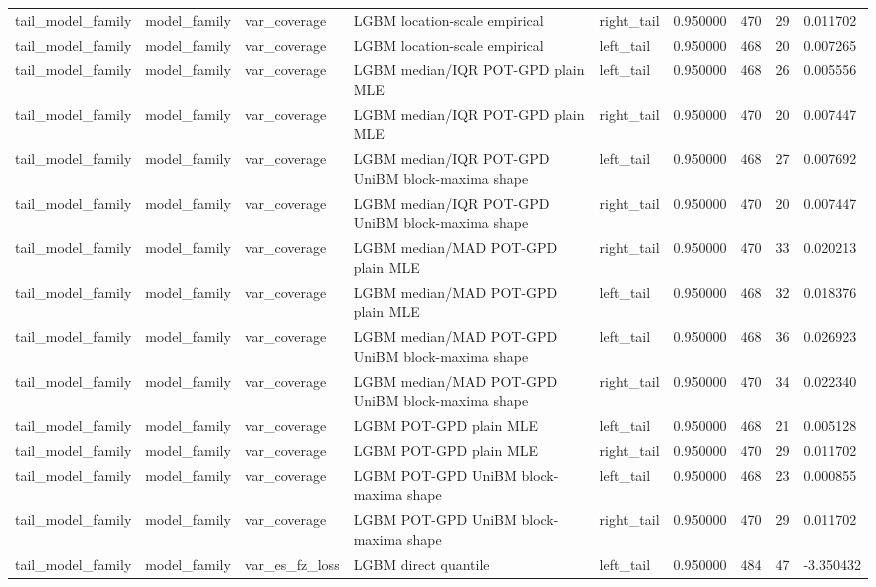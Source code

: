 \begin{tabular}{lllllrrr}
tail\_model\_family & model\_family & var\_coverage & LGBM location-scale empirical & right\_tail & 0.950000 & 470 & 29 & 0.011702 \\
tail\_model\_family & model\_family & var\_coverage & LGBM location-scale empirical & left\_tail & 0.950000 & 468 & 20 & 0.007265 \\
tail\_model\_family & model\_family & var\_coverage & LGBM median/IQR POT-GPD plain MLE & left\_tail & 0.950000 & 468 & 26 & 0.005556 \\
tail\_model\_family & model\_family & var\_coverage & LGBM median/IQR POT-GPD plain MLE & right\_tail & 0.950000 & 470 & 20 & 0.007447 \\
tail\_model\_family & model\_family & var\_coverage & LGBM median/IQR POT-GPD UniBM block-maxima shape & left\_tail & 0.950000 & 468 & 27 & 0.007692 \\
tail\_model\_family & model\_family & var\_coverage & LGBM median/IQR POT-GPD UniBM block-maxima shape & right\_tail & 0.950000 & 470 & 20 & 0.007447 \\
tail\_model\_family & model\_family & var\_coverage & LGBM median/MAD POT-GPD plain MLE & right\_tail & 0.950000 & 470 & 33 & 0.020213 \\
tail\_model\_family & model\_family & var\_coverage & LGBM median/MAD POT-GPD plain MLE & left\_tail & 0.950000 & 468 & 32 & 0.018376 \\
tail\_model\_family & model\_family & var\_coverage & LGBM median/MAD POT-GPD UniBM block-maxima shape & left\_tail & 0.950000 & 468 & 36 & 0.026923 \\
tail\_model\_family & model\_family & var\_coverage & LGBM median/MAD POT-GPD UniBM block-maxima shape & right\_tail & 0.950000 & 470 & 34 & 0.022340 \\
tail\_model\_family & model\_family & var\_coverage & LGBM POT-GPD plain MLE & left\_tail & 0.950000 & 468 & 21 & 0.005128 \\
tail\_model\_family & model\_family & var\_coverage & LGBM POT-GPD plain MLE & right\_tail & 0.950000 & 470 & 29 & 0.011702 \\
tail\_model\_family & model\_family & var\_coverage & LGBM POT-GPD UniBM block-maxima shape & left\_tail & 0.950000 & 468 & 23 & 0.000855 \\
tail\_model\_family & model\_family & var\_coverage & LGBM POT-GPD UniBM block-maxima shape & right\_tail & 0.950000 & 470 & 29 & 0.011702 \\
tail\_model\_family & model\_family & var\_es\_fz\_loss & LGBM direct quantile & left\_tail & 0.950000 & 484 & 47 & -3.350432 \\

\end{tabular}
